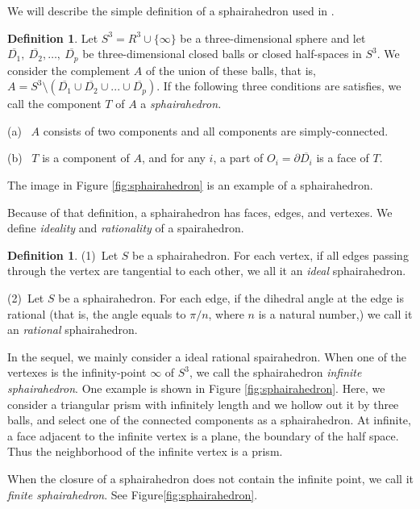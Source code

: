 \documentclass[suppldata, dvipdfmx]{interact}
\theoremstyle{plain}%
\theoremstyle{definition}
\newtheorem{definition}[theorem]{Definition}
\theoremstyle{remark}
\theoremstyle{problemstyle}
\begin{document}
We will describe the simple definition of a sphairahedron used in \cite{bridges2018}.
\begin{definition}
Let $S^3 = R^3 \cup \{\infty\}$ be a three-dimensional sphere and let
$\overline{D_1},~\overline{D_2},\ldots,~\overline{D_p}$ be
three-dimensional closed balls or closed half-spaces in $S^3$.
We consider the complement $A$ of the union of these balls, that is,
$A = S^3 \setminus (\overline{D_1} \cup \overline{D_2} \cup ... \cup \overline{D_p})$.
If the following three conditions are satisfies, we call the component $T$ of $A$ a {\it sphairahedron.} \par
(a) \ $A$ consists of two components and all components are simply-connected.\par
(b) \ $T$ is a component of $A$, and for any $i$, a part of $O_i=\partial\overline{D_i}$ is a face of $T$.
\end{definition}
The image in Figure \ref{fig:sphairahedron}
is an example of a sphairahedron. 

Because of that definition, a sphairahedron has faces, edges, and
vertexes. We define \emph{ideality} and \emph{rationality} of a spairahedron.

\begin{definition}
(1)\ Let $S$ be a sphairahedron.  For each vertex, if all edges passing through the vertex are tangential to each other, we all it an \emph{ideal} sphairahedron.\par 
(2)\ Let $S$ be a sphairahedron.  For each edge, if the dihedral angle at the edge is rational (that is, the angle equals to $\pi/n$, where $n$ is a natural number,) we call it an \emph{rational} sphairahedron.
\end{definition}

In the sequel, we mainly consider a ideal rational spairahedron.  
When one of the vertexes is the infinity-point $\infty$ of $S^3$,
we call the sphairahedron \textit{infinite sphairahedron}.
One example is shown in Figure
\ref{fig:sphairahedron}.
Here, we consider a triangular prism with infinitely length and we hollow
out it by three balls, and select one of the connected components as a  sphairahedron.  At infinite, a face adjacent to the infinite vertex is a plane, the boundary of the half space.  Thus the neighborhood of the infinite vertex is a prism.

When the closure of a sphairahedron does not contain the infinite point,
we call it \textit{finite sphairahedron}.
See Figure\ref{fig:sphairahedron}.
\end{document}
